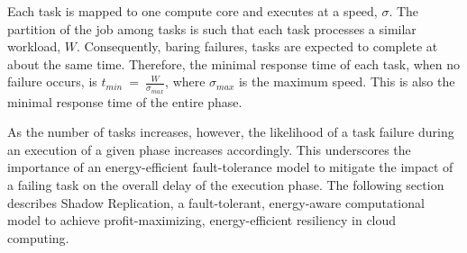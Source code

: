 Each task is mapped to one compute core and executes at a speed, $\sigma$. The partition of the job among tasks is
such that each task processes a similar
workload, $W$. Consequently, baring failures, tasks are expected to
complete at about the same time. Therefore, the minimal response time
of each task, when no failure occurs, is
$t_{min}~=~\frac{W}{\sigma_{max}}$, where $\sigma_{max}$ is the maximum speed. This is also the minimal response
time of the entire phase. 

As the number of tasks increases, however, the likelihood of a task
failure during an execution of a given phase increases
accordingly. This underscores the importance of an energy-efficient
fault-tolerance model to mitigate the impact of a failing task on the
overall delay of the execution phase. The following section describes
Shadow Replication, a fault-tolerant, energy-aware computational model to achieve profit-maximizing,
energy-efficient resiliency in cloud computing.


